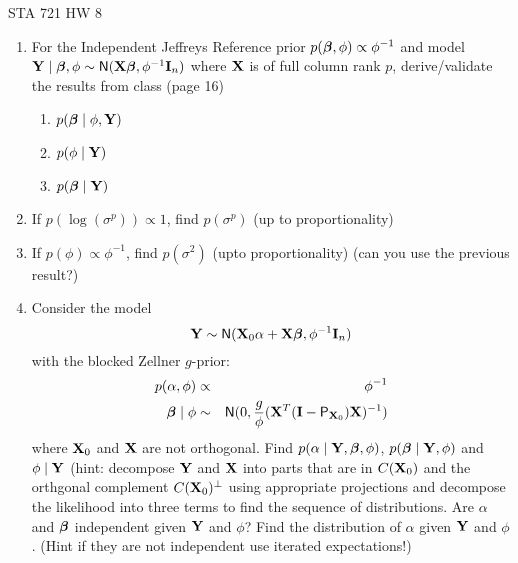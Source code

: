 \documentclass{article}
\begin{document}
\begin{center}
  STA 721 HW 8
\end{center}

\begin{enumerate}
\item For the Independent Jeffreys Reference prior $p(\boldsymbol{\beta}, \phi) \propto
  \phi^{-1}$ and model $\mathbf{Y} \mid \boldsymbol{\beta}, \phi \sim \textsf{N}(\mathbf{X} \boldsymbol{\beta}, \phi^{-1} \mathbf{I}_n)$ where
  $\mathbf{X}$ is of full column rank $p$, derive/validate the results from
  class  (page 16)
  \begin{enumerate}
  \item $p(\boldsymbol{\beta} \mid \phi, \mathbf{Y})$ 
  \item $p(\phi \mid \mathbf{Y})$
  \item $p(\boldsymbol{\beta} \mid \mathbf{Y})$
  \end{enumerate}
\item If $p(\log(\sigma^p)) \propto 1$, find $p(\sigma^p)$ (up to
  proportionality)
\item If $p(\phi) \propto \phi^{-1}$, find  $p(\sigma^2)$ (upto
  proportionality) (can you use the previous result?)
\item Consider the model 
$$\mathbf{Y} \sim \textsf{N}(\mathbf{X}_0 \alpha + \mathbf{X} \boldsymbol{\beta}, \phi^{-1} \mathbf{I}_n)$$ 
with the blocked Zellner $g$-prior:
\begin{eqnarray}
  p(\alpha, \phi) &\propto& \phi^{-1} \\
 \boldsymbol{\beta} \mid \phi & \sim & \textsf{N}(0, \frac{g}{\phi} (\mathbf{X}^T(\mathbf{I}-\textsf{P}_{\mathbf{X}_0}) \mathbf{X})^{-1})
\end{eqnarray}
where $\mathbf{X}_0$ and $\mathbf{X}$ are not orthogonal.
Find $p(\alpha \mid \mathbf{Y}, \boldsymbol{\beta}, \phi)$, $p(\boldsymbol{\beta} \mid \mathbf{Y}, \phi)$ and $\phi \mid
\mathbf{Y}$ (hint:  decompose $\mathbf{Y}$ and  $\mathbf{X}$ into parts that are in $C(\mathbf{X}_0)$ and the
orthgonal complement $C(\mathbf{X}_0)^\perp$ using appropriate projections and
decompose the likelihood into three terms to find the sequence of distributions. Are $\alpha$ and $\boldsymbol{\beta}$ independent given
$\mathbf{Y}$ and $\phi$?  Find 
the distribution of $\alpha$ given $\mathbf{Y}$ and $\phi$.  (Hint if they are
not independent use iterated expectations!)
\end{enumerate}
\end{document}
